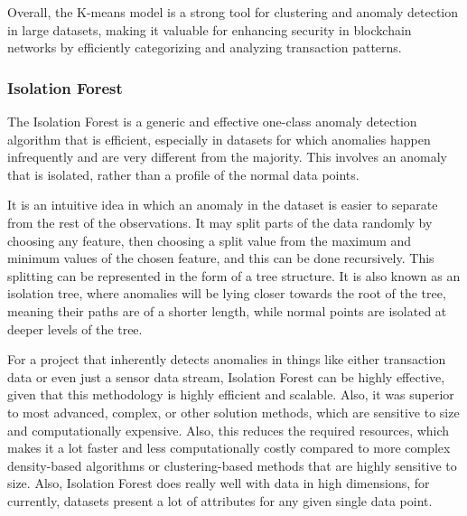 \documentclass[journal]{IEEEtran}
\begin{document}
Overall, the K-means model is a strong tool for clustering and anomaly detection in large datasets, making it valuable for enhancing security in blockchain networks by efficiently categorizing and analyzing transaction patterns.



\subsubsection{{Isolation Forest}}

The Isolation Forest is a generic and effective one-class anomaly detection algorithm that is efficient, especially in datasets for which anomalies happen infrequently and are very different from the majority. This involves an anomaly that is isolated, rather than a profile of the normal data points.

It is an intuitive idea in which an anomaly in the dataset is easier to separate from the rest of the observations. It may split parts of the data randomly by choosing any feature, then choosing a split value from the maximum and minimum values of the chosen feature, and this can be done recursively. This splitting can be represented in the form of a tree structure. It is also known as an isolation tree, where anomalies will be lying closer towards the root of the tree, meaning their paths are of a shorter length, while normal points are isolated at deeper levels of the tree.

For a project that inherently detects anomalies in things like either transaction data or even just a sensor data stream, Isolation Forest can be highly effective, given that this methodology is highly efficient and scalable. Also, it was superior to most advanced, complex, or other solution methods, which are sensitive to size and computationally expensive. Also, this reduces the required resources, which makes it a lot faster and less computationally costly compared to more complex density-based algorithms or clustering-based methods that are highly sensitive to size. Also, Isolation Forest does really well with data in high dimensions, for currently, datasets present a lot of attributes for any given single data point.
\end{document}
